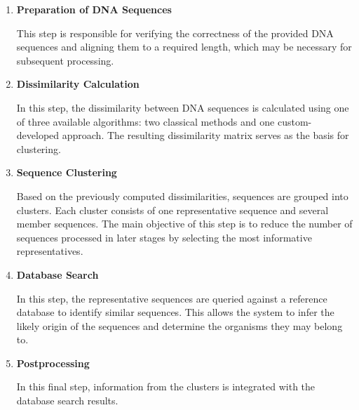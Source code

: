 \documentclass[pdflatex,sn-vancouver-num]{sn-jnl}%
\begin{document}
        \begin{enumerate}
            \item {
                \textbf{Preparation of DNA Sequences}

                This step is responsible for verifying the correctness of the provided DNA sequences and aligning them to a required length, which may be necessary for subsequent processing.
            }
            \item {
                \textbf{Dissimilarity Calculation}

                In this step, the dissimilarity between DNA sequences is calculated using one of three available algorithms: two classical methods and one custom-developed approach. The resulting dissimilarity matrix serves as the basis for clustering.
            }
            \item {
                \textbf{Sequence Clustering}

                Based on the previously computed dissimilarities, sequences are grouped into clusters. Each cluster consists of one representative sequence and several member sequences. The main objective of this step is to reduce the number of sequences processed in later stages by selecting the most informative representatives.
            }
            \item {
                \textbf{Database Search}

                In this step, the representative sequences are queried against a reference database to identify similar sequences. This allows the system to infer the likely origin of the sequences and determine the organisms they may belong to.
            }
            \item {
                \textbf{Postprocessing}

                In this final step, information from the clusters is integrated with the database search results.
            }
        \end{enumerate}
\end{document}
